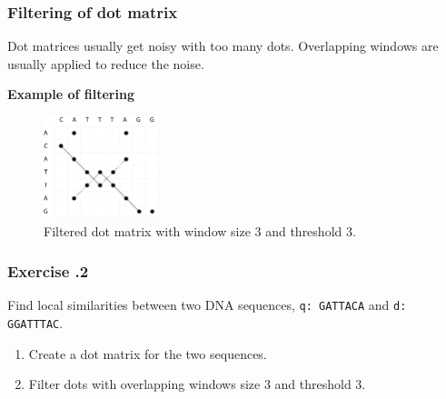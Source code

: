 \subsubsection*{Filtering of dot matrix}
Dot matrices usually get noisy with too many dots.  Overlapping windows are usually applied to reduce the noise.

\bigskip 
\noindent
\textbf{Example of filtering}

\begin{figure}[H]
  \centering
      \includegraphics[width=0.3\textwidth]{fig04/dot_matrix.png}
  \caption{Filtered dot matrix with window size 3 and threshold 3.}
\end{figure}

%
%
\subsubsection*{Exercise \thesection.2}
Find local similarities between two DNA sequences, \verb|q: GATTACA| and \verb|d: GGATTTAC|.

\begin{enumerate}
\item Create a dot matrix for the two sequences.
\item Filter dots with overlapping windows size 3 and threshold 3.
\end{enumerate}

\bigskip 

%
